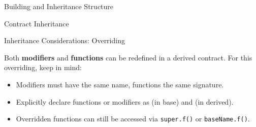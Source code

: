 \documentclass[handout]{beamer}
\begin{document}
\begin{frame}{Building and Inheritance Structure}

\vspace{0.5em}	
\begin{minipage}{0.48\textwidth}
	\begin{samplecode}{Contract Inheritance}
		
	\end{samplecode}
\end{minipage}	
\begin{minipage}{0.48\textwidth}
	\begin{figure}[t]
		\centering
		\begin{tikzpicture}[scale=1.0, every node/.style={scale=1.0}]
			
		\end{tikzpicture}
	\end{figure}
\end{minipage}	

\vspace{2.0em}


\end{frame}


\begin{frame}{Inheritance Considerations: Overriding}

Both \textbf{modifiers} and \textbf{functions} can be redefined in a derived contract. For this overriding, keep in mind:
\vspace{0.5em}
\begin{itemize}
	\item<2-> Modifiers must have the same name, functions the same signature.
	\item<3-> Explicitly declare functions or modifiers as  (in base) and  (in derived).
	\item<4->  Overridden functions can still be accessed via \texttt{super.f()} or \texttt{baseName.f()}.	
\end{itemize}

\vspace{1.5em}


\end{frame}
\end{document}
